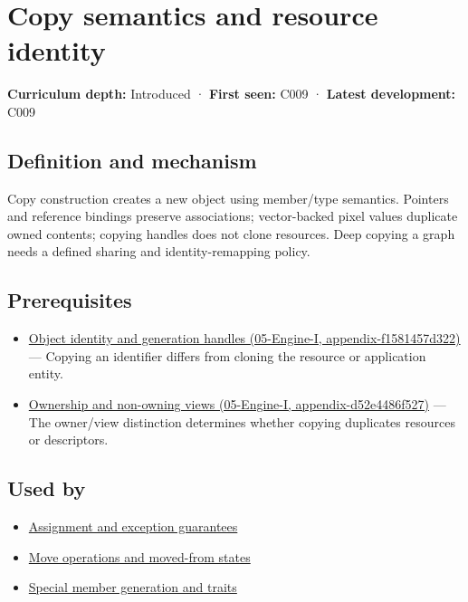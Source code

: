 \hypertarget{appendix-1340cd1ce582}{}
\section{Copy semantics and resource identity}\label{appendix-1340cd1ce582-copy-semantics-and-resource-identity}

\textbf{Curriculum depth:} Introduced · \textbf{First seen:} C009 · \textbf{Latest development:} C009

\subsection{Definition and mechanism}\label{appendix-1340cd1ce582-definition-and-mechanism}

Copy construction creates a new object using member/type semantics. Pointers and reference bindings preserve associations; vector-backed pixel values duplicate owned contents; copying handles does not clone resources. Deep copying a graph needs a defined sharing and identity-remapping policy.

\subsection{Prerequisites}\label{appendix-1340cd1ce582-prerequisites}

\begin{itemize}
\tightlist
\item
  \href{../05-Engine-I/main.pdf\#nameddest=appendix-f1581457d322}{Object identity and generation handles (05-Engine-I, appendix-f1581457d322)} --- Copying an identifier differs from cloning the resource or application entity.
\item
  \href{../05-Engine-I/main.pdf\#nameddest=appendix-d52e4486f527}{Ownership and non-owning views (05-Engine-I, appendix-d52e4486f527)} --- The owner/view distinction determines whether copying duplicates resources or descriptors.
\end{itemize}

\subsection{Used by}\label{appendix-1340cd1ce582-used-by}

\begin{itemize}
\tightlist
\item
  \hyperref[appendix-bea6beb5350f]{Assignment and exception guarantees}
\item
  \hyperref[appendix-5636651017c2]{Move operations and moved-from states}
\item
  \hyperref[appendix-42e02a12c694]{Special member generation and traits}
\end{itemize}

